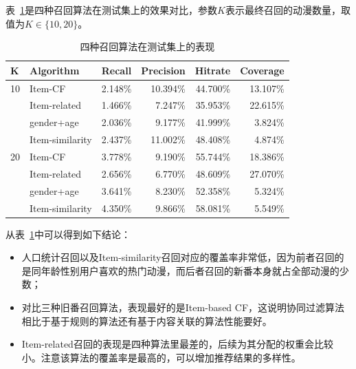     表~\ref{tab:recall}是四种召回算法在测试集上的效果对比，参数$K$表示最终召回的动漫数量，取值为$K\in\{10,20\}$。
    \begin{table}[htbp]
      \centering
      \caption{四种召回算法在测试集上的表现}
      \begin{tabular}{rlrrrr}
        \toprule
        \multicolumn{1}{l}{K} & Algorithm & \multicolumn{1}{l}{Recall} & \multicolumn{1}{l}{Precision} & \multicolumn{1}{l}{Hit\;rate} & \multicolumn{1}{l}{Coverage} \\
        \midrule
        10   & Item-CF & 2.148\% & 10.394\% & 44.700\% & 13.107\% \\
        & Item-related & 1.466\% & 7.247\% & 35.953\% & 22.615\% \\
        & gender+age & 2.036\% & 9.177\% & 41.999\% & 3.824\% \\
        & Item-similarity & 2.437\% & 11.002\% & 48.408\% & 4.874\% \\
        20   & Item-CF & 3.778\% & 9.190\% & 55.744\% & 18.386\% \\
        & Item-related & 2.656\% & 6.770\% & 48.609\% & 27.070\% \\
        & gender+age & 3.641\% & 8.230\% & 52.358\% & 5.324\% \\
        & Item-similarity & 4.350\% & 9.866\% & 58.081\% & 5.549\% \\
        \bottomrule
      \end{tabular}%
      \label{tab:recall}%
    \end{table}%

    从表~\ref{tab:recall}中可以得到如下结论：
    \begin{itemize}
      \item 人口统计召回以及Item-similarity召回对应的覆盖率非常低，因为前者召回的是同年龄性别用户喜欢的热门动漫，而后者召回的新番本身就占全部动漫的少数；
      \item 对比三种旧番召回算法，表现最好的是Item-based CF，这说明协同过滤算法相比于基于规则的算法还有基于内容关联的算法性能要好。
      \item Item-related召回的表现是四种算法里最差的，后续为其分配的权重会比较小。注意该算法的覆盖率是最高的，可以增加推荐结果的多样性。
    \end{itemize}

